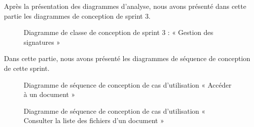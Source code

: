 Après la présentation des diagrammes d'analyse, nous avons présenté dans cette partie les diagrammes de conception de sprint 3.
\newpage 
\begin{landscape}


\begin{figure}[H]
  \centering
  \caption{Diagramme de classe de conception de sprint 3 : « Gestion des signatures »}
  \label{fig:class_diagram_signatures3}
\end{figure}
\end{landscape}
\newpage
Dans cette partie, nous avons présenté les diagrammes de séquence de conception de cette sprint.\\
\begin{figure}[H]
  \centering
  \caption{Diagramme de séquence de conception de cas d'utilisation « Accéder à un document »}
  \label{fig:sequence_conception_preview_document}
\end{figure}
\begin{figure}[H]
  \centering
  \caption{Diagramme de séquence de conception de cas d'utilisation « Consulter la liste des fichiers d'un document »}
  \label{fig:sequence_conception_previewFiles}
\end{figure}
